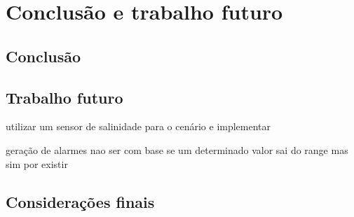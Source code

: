 \chapter{Conclusão e trabalho futuro}


\section{Conclusão}

\section{Trabalho futuro}


utilizar um sensor de salinidade para o cenário e implementar

geração de alarmes nao ser com base se um determinado valor sai do range mas sim por existir 

\section{Considerações finais}